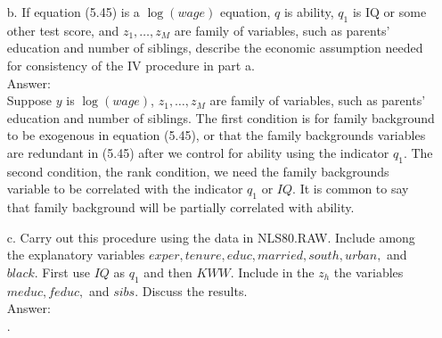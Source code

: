 \documentclass[10pt]{article}
\begin{document}
\begin{enumerate}
\item[b.] If equation (5.45) is a $\log(wage)$ equation, $q$ is ability, $q_1$ is IQ or some other test score, and $z_1,\ldots,z_M$ are family of variables, such as parents' education and number of siblings, describe the economic assumption needed for consistency of the IV procedure in part a.
\\ Answer:\\
Suppose $y$ is $\log(wage)$, $z_1,\ldots,z_M$ are family of variables, such as parents' education and number of siblings. The first condition is for family background to be exogenous in equation (5.45), or that the family backgrounds variables are redundant in (5.45) after we control for ability using the indicator $q_1$. The second condition, the rank condition, we need the family backgrounds variable to be correlated with the indicator $q_1$ or $IQ$. It is common to say that family background will be partially correlated with ability.

\item[c.] Carry out this procedure using the data in NLS80.RAW. Include among the explanatory variables $exper, tenure,educ,married,south,urban,$ and $black$. First use $IQ$ as $q_1$ and then $KWW$. Include in the $z_h$ the variables $meduc,feduc,$ and $sibs.$ Discuss the results.
\\ Answer:\\
.   

\end{enumerate}
\end{document}
